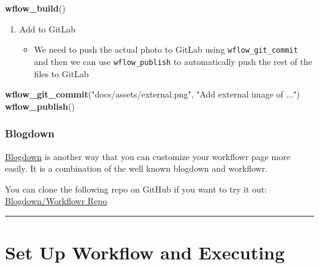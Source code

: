 \documentclass[openany]{book}
\newenvironment{Shaded}{\begin{snugshade}}{\end{snugshade}}
\newcommand{\KeywordTok}[1]{\textcolor[rgb]{0.13,0.29,0.53}{\textbf{#1}}}
\newcommand{\NormalTok}[1]{#1}
\newcommand{\StringTok}[1]{\textcolor[rgb]{0.31,0.60,0.02}{#1}}
\providecommand{\tightlist}{%
  \setlength{\itemsep}{0pt}\setlength{\parskip}{0pt}}
\begin{document}
\begin{Shaded}
\begin{Highlighting}[]
\KeywordTok{wflow_build}\NormalTok{()}
\end{Highlighting}
\end{Shaded}

\begin{enumerate}
\def\labelenumi{\arabic{enumi}.}
\setcounter{enumi}{3}
\tightlist
\item
  Add to GitLab

  \begin{itemize}
  \tightlist
  \item
    We need to push the actual photo to GitLab using \texttt{wflow\_git\_commit} and then we can use \texttt{wflow\_publish} to automatically push the rest of the files to GitLab
  \end{itemize}
\end{enumerate}

\begin{Shaded}
\begin{Highlighting}[]
\KeywordTok{wflow_git_commit}\NormalTok{(}\StringTok{"docs/assets/external.png"}\NormalTok{, }\StringTok{"Add external image of ..."}\NormalTok{)}
\KeywordTok{wflow_publish}\NormalTok{()}
\end{Highlighting}
\end{Shaded}

\hypertarget{blogdown}{%
\subsubsection{Blogdown}\label{blogdown}}

\href{https://bookdown.org/yihui/blogdown/a-quick-example.html}{Blogdown} is another way that you can customize your workflowr page more easily. It is a combination of the well known blogdown and workflowr.

You can clone the following repo on GitHub if you want to try it out: \href{https://github.com/docmanny/workflowr-blogdown-experiment}{Blogdown/Workflowr Repo}

\begin{center}\rule{0.5\linewidth}{\linethickness}\end{center}

\hypertarget{set-up-workflow-and-executing}{%
\section{Set Up Workflow and Executing}\label{set-up-workflow-and-executing}}
\end{document}
